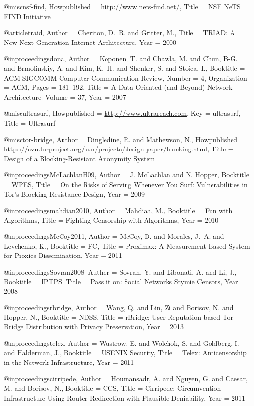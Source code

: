 {{@misc{nsf-find,
	Howpublished = {http://www.nets-find.net/},
	Title = {{NSF NeTS FIND Initiative}}}

@article{traid,
	Author = {Cheriton, D.~R. and Gritter, M.},
	Title = {{TRIAD: A New Next-Generation Internet Architecture}},
	Year = {2000}}

@inproceedings{dona,
	Author = {Koponen, T. and Chawla, M. and Chun, B-G. and Ermolinskiy, A. and Kim, K.~H. and Shenker, S. and Stoica, I.},
	Booktitle = {ACM SIGCOMM Computer Communication Review},
	Number = {4},
	Organization = {ACM},
	Pages = {181--192},
	Title = {{A Data-Oriented (and Beyond) Network Architecture}},
	Volume = {37},
	Year = {2007}}

@misc{ultrasurf,
	Howpublished = {\url{http://www.ultrareach.com}},
	Key = {ultrasurf},
	Title = {{Ultrasurf}}}

@misc{tor-bridge,
	Author = {Dingledine, R. and Mathewson, N.},
	Howpublished = {\url{https://svn.torproject.org/svn/projects/design-paper/blocking.html}},
	Title = {{Design of a Blocking-Resistant Anonymity System}}}

@inproceedings{McLachlanH09,
	Author = {J. McLachlan and N. Hopper},
	Booktitle = {WPES},
	Title = {{On the Risks of Serving Whenever You Surf: Vulnerabilities in Tor's Blocking Resistance Design}},
	Year = {2009}}

@inproceedings{mahdian2010,
	Author = {Mahdian, M.},
	Booktitle = {{Fun with Algorithms}},
	Title = {{Fighting Censorship with Algorithms}},
	Year = {2010}}

@inproceedings{McCoy2011,
	Author = {McCoy, D. and Morales, J.~A. and Levchenko, K.},
	Booktitle = {FC},
	Title = {{Proximax: A Measurement Based System for Proxies Dissemination}},
	Year = {2011}}

@inproceedings{Sovran2008,
	Author = {Sovran, Y. and Libonati, A. and Li, J.},
	Booktitle = {IPTPS},
	Title = {{Pass it on: Social Networks Stymie Censors}},
	Year = {2008}}

@inproceedings{rbridge,
	Author = {Wang, Q. and Lin, Zi and Borisov, N. and Hopper, N.},
	Booktitle = {{NDSS}},
	Title = {{rBridge: User Reputation based Tor Bridge Distribution with Privacy Preservation}},
	Year = {2013}}

@inproceedings{telex,
	Author = {Wustrow, E. and Wolchok, S. and Goldberg, I. and Halderman, J.},
	Booktitle = {{USENIX Security}},
	Title = {{Telex: Anticensorship in the Network Infrastructure}},
	Year = {2011}}

@inproceedings{cirripede,
	Author = {Houmansadr, A. and Nguyen, G. and Caesar, M. and Borisov, N.},
	Booktitle = {CCS},
	Title = {{Cirripede: Circumvention Infrastructure Using Router Redirection with Plausible Deniability}},
	Year = {2011}}

}}
